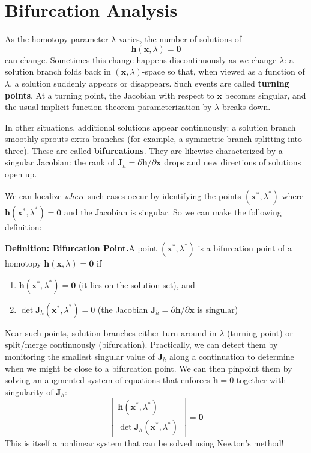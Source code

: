 \section{Bifurcation Analysis}
\label{sec:bifurcation_analysis}
As the homotopy parameter $\lambda$ varies, the number of solutions of
\[
\mathbf{h}(\mathbf{x},\lambda)=\mathbf{0}
\]
can change. Sometimes this change happens discontinuously as we change $\lambda$: a solution branch folds back in $(\mathbf{x},\lambda)$-space so that, when viewed as a function of $\lambda$, a solution suddenly appears or disappears. Such events are called \textbf{turning points}. At a turning point, the Jacobian with respect to $\mathbf{x}$ becomes singular, and the usual implicit function theorem parameterization by $\lambda$ breaks down.

In other situations, additional solutions appear continuously: a solution branch smoothly sprouts extra branches (for example, a symmetric branch splitting into three). These are called \textbf{bifurcations}. They are likewise characterized by a singular Jacobian: the rank of $\mathbf{J}_h=\partial \mathbf{h}/\partial \mathbf{x}$ drops and new directions of solutions open up.

We can localize \emph{where} such cases occur by identifying the points $(\mathbf{x}^*,\lambda^*)$ where $\mathbf{h}(\mathbf{x}^*,\lambda^*)=\mathbf{0}$ and the Jacobian is singular. So we can make the following definition:
\begin{definitionBox}
    \textbf{Definition: Bifurcation Point.}\quad A point $(\mathbf{x}^*,\lambda^*)$ is a bifurcation point of a homotopy $\mathbf{h}(\mathbf{x},\lambda)=\mathbf{0}$ if
    \begin{enumerate}
        \item $\mathbf{h}(\mathbf{x}^*,\lambda^*)=\mathbf{0}$ \quad (it lies on the solution set), and
        \item $\det \mathbf{J}_h(\mathbf{x}^*,\lambda^*)=0$ \quad (the Jacobian $\mathbf{J}_h=\partial \mathbf{h}/\partial \mathbf{x}$ is singular)
    \end{enumerate}
\end{definitionBox}
Near such points, solution branches either turn around in $\lambda$ (turning point) or split/merge continuously (bifurcation). Practically, we can detect them by monitoring the smallest singular value of $\mathbf{J}_h$ along a continuation to determine when we might be close to a bifurcation point. We can then pinpoint them by solving an augmented system of equations that enforces $\mathbf{h}=0$ together with singularity of $\mathbf{J}_h$:
\begin{equation}
    \begin{bmatrix}
    \mathbf{h}(\mathbf{x}^*,\lambda^*) \\
    \det \mathbf{J}_h(\mathbf{x}^*,\lambda^*)
    \end{bmatrix} = \mathbf{0}
\end{equation}
This is itself a nonlinear system that can be solved using Newton's method!

